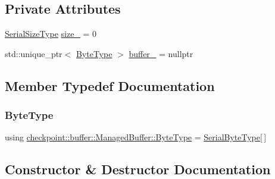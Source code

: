 \subsection*{Private Attributes}
\begin{DoxyCompactItemize}
\item 
\hyperlink{namespacecheckpoint_a083f6674da3f94c2901b18c6d238217c}{Serial\+Size\+Type} \hyperlink{structcheckpoint_1_1buffer_1_1_managed_buffer_a91bd6942b3e8f48c9edbcc6e1b148982}{size\+\_\+} = 0
\item 
std\+::unique\+\_\+ptr$<$ \hyperlink{structcheckpoint_1_1buffer_1_1_managed_buffer_a89ff3aa4c92cd2c65973751ff4328dd5}{Byte\+Type} $>$ \hyperlink{structcheckpoint_1_1buffer_1_1_managed_buffer_a7918a4749b6ab59e0f53ec761ee0b2e2}{buffer\+\_\+} = nullptr
\end{DoxyCompactItemize}


\subsection{Member Typedef Documentation}
\mbox{\label{structcheckpoint_1_1buffer_1_1_managed_buffer_a89ff3aa4c92cd2c65973751ff4328dd5}} 
\subsubsection{\texorpdfstring{Byte\+Type}{ByteType}}
{\footnotesize\ttfamily using \hyperlink{structcheckpoint_1_1buffer_1_1_managed_buffer_a89ff3aa4c92cd2c65973751ff4328dd5}{checkpoint\+::buffer\+::\+Managed\+Buffer\+::\+Byte\+Type} =  \hyperlink{namespacecheckpoint_ae57f01cdc0b81776c23b6c7c934c58f5}{Serial\+Byte\+Type}\mbox{[}$\,$\mbox{]}}



\subsection{Constructor \& Destructor Documentation}
\mbox{\label{structcheckpoint_1_1buffer_1_1_managed_buffer_aa73edc51a8e538d5ca67fc9d1df42ba5}} 
